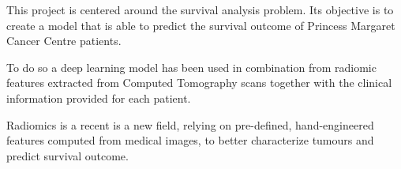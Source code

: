 

This project is centered around the survival analysis problem. Its objective
is to create a model that is able to predict the survival outcome of Princess 
Margaret Cancer Centre patients.

To do so a deep learning model has been used in combination from radiomic features
extracted from Computed Tomography scans together with the clinical information
provided for each patient.

Radiomics is a recent is a new field, relying on pre-defined, 
hand-engineered features computed from medical images, to better characterize tumours 
and predict survival outcome.